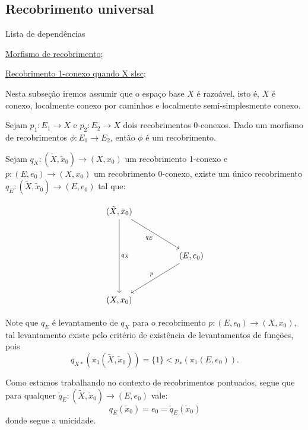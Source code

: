 \subsection{Recobrimento universal}
\label{recobrimento-universal}
\begin{titlemize}{Lista de dependências}
	\item \hyperref[morfismo-de-recobrimento-def]{Morfismo de recobrimento};\\
    \item \hyperref[recobrimento-1-conexo-prop]{Recobrimento 1-conexo quando X slsc};
\end{titlemize}
Nesta subseção iremos assumir que o espaço base $X$ é razoável, isto é, $X$ é conexo, localmente conexo por caminhos e localmente semi-simplesmente conexo.
\begin{af}
	Sejam $p_1:E_1 \longrightarrow X$ e $p_2:E_2 \longrightarrow X$ dois recobrimentos 0-conexos. Dado um morfismo de recobrimentos $\phi:E_1 \longrightarrow E_2$, então $\phi$ é um recobrimento.
\end{af}

\begin{thm}
    Sejam $q_X:(\tilde X, \tilde x_0) \longrightarrow (X,x_0)$ um recobrimento 1-conexo e $p:(E,e_0) \longrightarrow (X,x_0)$ um recobrimento 0-conexo, existe um único recobrimento $q_E:(\tilde X, \tilde x_0) \longrightarrow (E,e_0)$ tal que:
\end{thm}
\[\begin{tikzcd}
	{(\tilde X, \tilde x_0)} \\
	\\
	&& {(E,e_0)} \\
	\\
	{(X,x_0)}
	\arrow["{q_E}"', from=1-1, to=3-3]
	\arrow["{q_X}", from=1-1, to=5-1]
	\arrow["p"', from=3-3, to=5-1]
\end{tikzcd}\]

\begin{dem}
    Note que $q_E$ é levantamento de $q_X$ para o recobrimento $p:(E,e_0) \longrightarrow (X,x_0)$, tal levantamento existe pelo critério de existência de levantamentos de funções, pois $$q_{X*}(\pi_1(\tilde X, \tilde x_0)) = \{1\} < p_*(\pi_1(E, e_0)).$$
    
    Como estamos trabalhando no contexto de recobrimentos pontuados, segue que para qualquer $\tilde q_E:(\tilde X, \tilde x_0) \longrightarrow (E, e_0)$ vale: $$q_E(\tilde x_0) = e_0 = \tilde q_E(\tilde x_0)$$
    donde segue a unicidade.
\end{dem}

